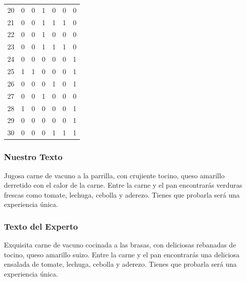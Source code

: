 \begin{table}
\begin{tabular}{|r|c|c|c|c|c|c|}
20 &         0 &         0 &         1 &         0 &         0 &         0 \\
21 &         0 &         0 &         1 &         1 &         1 &         0 \\
22 &         0 &         0 &         1 &         0 &         0 &         0 \\
23 &         0 &         0 &         1 &         1 &         1 &         0 \\
24 &         0 &         0 &         0 &         0 &         0 &         1 \\
25 &         1 &         1 &         0 &         0 &         0 &         1 \\
26 &         0 &         0 &         0 &         1 &         0 &         1 \\
27 &         0 &         0 &         1 &         0 &         0 &         0 \\
28 &         1 &         0 &         0 &         0 &         0 &         1 \\
29 &         0 &         0 &         0 &         0 &         0 &         1 \\
30 &         0 &         0 &         0 &         1 &         1 &         1 

\end{tabular}
\end{table}



\subsubsection{Nuestro Texto}

Jugosa carne de vacuno  a la parrilla, con crujiente tocino, queso amarillo  derretido con el calor de la carne. Entre la carne y el pan encontrarás verduras frescas como tomate, lechuga, cebolla y aderezo. Tienes que probarla será una experiencia única.

\subsubsection{Texto del Experto}

Exquisita carne de vacuno  cocinada a las brasas, con deliciosas rebanadas de tocino, queso amarillo suizo. Entre la carne y el pan encontrarás una deliciosa ensalada de tomate, lechuga, cebolla y aderezo. Tienes que probarla será una experiencia única.

